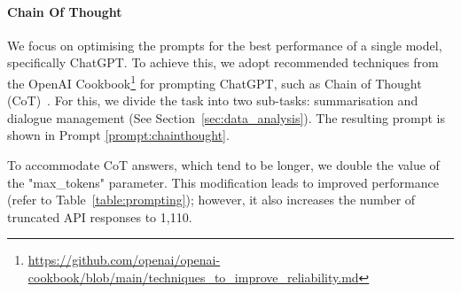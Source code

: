 \documentclass[11pt]{article}
\begin{document}
\begin{table}[!h]
    \centering
    \caption{Length statistics on responses, ordered by ascending average length}
    \label{table:length-stats}
\end{table}

\paragraph{Chain Of Thought}
We focus on optimising the prompts for the best performance of a single model, specifically ChatGPT. To achieve this, we adopt recommended techniques from the OpenAI Cookbook\footnote{\url{https://github.com/openai/openai-cookbook/blob/main/techniques_to_improve_reliability.md}} for prompting ChatGPT, such as Chain of Thought (CoT)~\cite{wei2022chain}. For this, we divide the task into two sub-tasks: summarisation and dialogue management (See Section~\ref{sec:data_analysis}). The resulting prompt is shown in Prompt \ref{prompt:chainthought}.

To accommodate CoT answers, which tend to be longer, we double the value of the "max\_tokens" parameter. This modification leads to improved performance (refer to Table~\ref{table:prompting}); however, it also increases the number of truncated API responses to 1,110.
\end{document}
